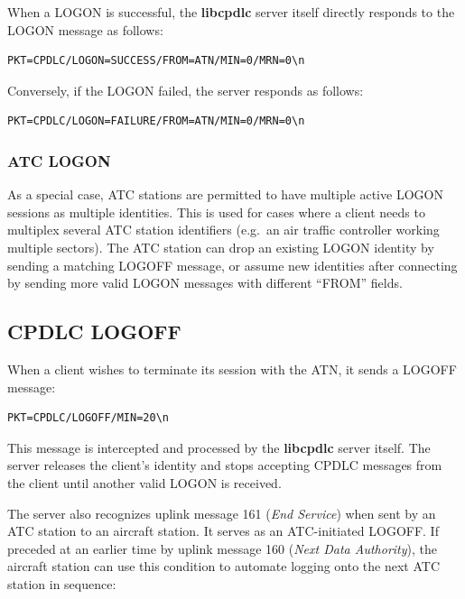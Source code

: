 \documentclass[a4paper,12pt]{article}
\newcommand{\libcpdlc}{\textbf{libcpdlc}\xspace}
\begin{document}
\noindent When a LOGON is successful, the \libcpdlc server itself
directly responds to the LOGON message as follows:

\begin{verbatim}
PKT=CPDLC/LOGON=SUCCESS/FROM=ATN/MIN=0/MRN=0\n
\end{verbatim}

\noindent Conversely, if the LOGON failed, the server responds as
follows:

\begin{verbatim}
PKT=CPDLC/LOGON=FAILURE/FROM=ATN/MIN=0/MRN=0\n
\end{verbatim}

\subsubsection{ATC LOGON}

As a special case, ATC stations are permitted to have multiple active
LOGON sessions as multiple identities. This is used for cases where a
client needs to multiplex several ATC station identifiers (e.g.\ an
air traffic controller working multiple sectors). The ATC station can
drop an existing LOGON identity by sending a matching LOGOFF message,
or assume new identities after connecting by sending more valid LOGON
messages with different ``FROM'' fields.

\subsection{CPDLC LOGOFF}

When a client wishes to terminate its session with the ATN, it sends
a LOGOFF message:

\begin{verbatim}
PKT=CPDLC/LOGOFF/MIN=20\n
\end{verbatim}

\noindent This message is intercepted and processed by the \libcpdlc
server itself. The server releases the client's identity and stops
accepting CPDLC messages from the client until another valid LOGON is
received.

The server also recognizes uplink message 161 ({\em End Service}) when
sent by an ATC station to an aircraft station. It serves as an
ATC-initiated LOGOFF. If preceded at an earlier time by uplink message
160 ({\em Next Data Authority}), the aircraft station can use this
condition to automate logging onto the next ATC station in sequence:
\end{document}
